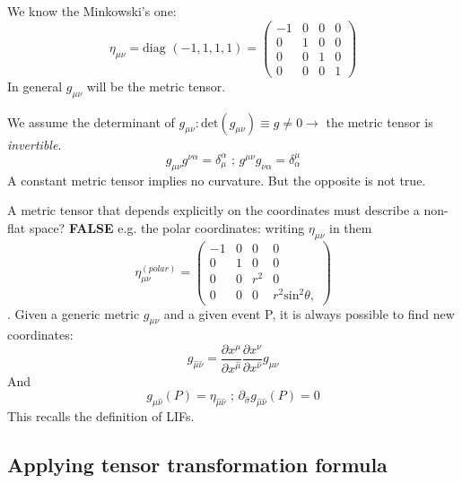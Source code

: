 We know the Minkowski's one:
\begin{equation}
\eta_{\mu \nu } = \text{diag }\left( -1,1,1,1 \right) = \begin{pmatrix}
-1 & 0 & 0 & 0 \\
0 & 1 & 0 & 0 \\
0 & 0 & 1 & 0 \\
0 & 0 & 0 & 1
\end{pmatrix} 
\end{equation}
\bigskip
In general $g_{\mu \nu }$ will be the metric tensor.\par
We assume the determinant of $g_{\mu \nu }: \text{det}\left( g_{\mu \nu } \right) \equiv g \neq 0 \to $ the metric tensor is \emph{invertible}.
\[
g_{\mu \nu }g^{\nu \alpha } = \delta^{\alpha }_{\mu } \text{ ; } g^{\mu \nu }g_{\nu \alpha } = \delta^{\mu }_{\alpha }
\]
A constant metric tensor implies no curvature. But the opposite is not true.\par
A metric tensor that depends explicitly on the coordinates must describe a non-flat space? \textbf{FALSE} e.g. the polar coordinates: writing $\eta_{\mu \nu }$ in them
\begin{equation}
\eta_{\mu \nu }^{\left(polar\right)} = \begin{pmatrix}
-1 & 0 & 0 & 0 \\
0 & 1 & 0 & 0 \\
0 & 0 & r^{2} & 0 \\
0 & 0 & 0 & r^{2} \text{sin}^{2}\theta ,
\end{pmatrix} 
\end{equation}.
Given a generic metric $g_{\mu \nu }$ and a given event P, it is always possible to find new coordinates:
\[
g_{\hat{\mu }\hat{\nu }} = \frac{\partial x^{\mu }}{\partial x^{\hat{\mu }}} \frac{\partial x^{\nu }}{\partial x^{\hat{\nu }}} g_{\mu \nu }
\]
And
\[
g_{\hat{\mu }\hat{\nu }}\left( P \right) = \eta_{\hat{\mu }\hat{\nu }} \text{ ; } \partial_{\hat{\sigma }}g_{\hat{\mu }\hat{\nu }}\left( P \right)=0
\]
This recalls the definition of LIFs.


\subsection{Applying tensor transformation formula}\label{ex:changebasis}

